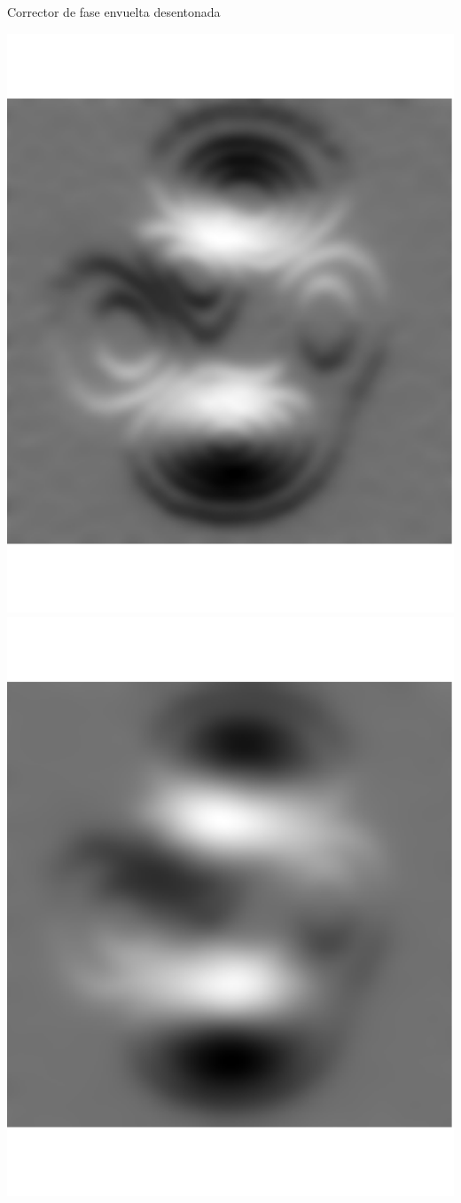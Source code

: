 \documentclass[]{beamer}
\begin{document}
\begin{frame}{Corrector de fase envuelta desentonada}
\begin{center}
\includegraphics[scale=0.15]{Images/Fig_frecuencias2.pdf}\quad
\includegraphics[scale=0.15]{Images/Fig_frecuencias3.pdf}



\end{center}
\end{frame}
\end{document}
